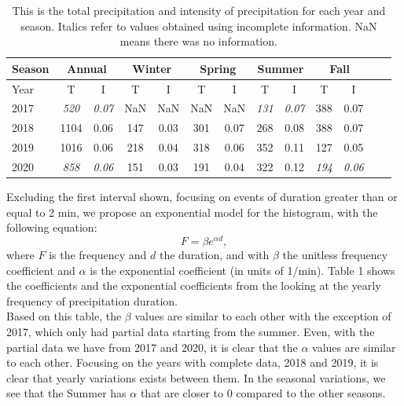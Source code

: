 \documentclass[11pt]{report}
\begin{document}
	
\begin{table}[t]
	\begin{center}
		\begin{tabular}{|l|*{11}{c|}r|}
			\hline
			Season    &       \multicolumn{2}{|c|}{Annual}          & \multicolumn{2}{|c|}{Winter}& \multicolumn{2}{|c|}{Spring}  & \multicolumn{2}{|c|}{Summer} &\multicolumn{2}{|c|}{Fall}  \\
			\hline
			Year      & T & I  & T & I  & T & I  & T & I  & T & I \\
			\hline
			2017      & \textit{520}  & \textit{0.07}  & NaN & NaN & NaN & NaN & \textit{131}  & \textit{0.07}  & 388  & 0.07  \\
			2018      & 1104           & 0.06  & 147 & 0.03 & 301 & 0.07 & 268  & 0.08  & 388 & 0.07  \\
			2019      & 1016           & 0.06  & 218  & 0.04 & 318 & 0.06 & 352 & 0.11  & 127 &  0.05 \\
			2020      & \textit{858}           & \textit{0.06}   & 151  & 0.03 & 191  & 0.04 & 322  & 0.12 & \textit{194} & \textit{0.06}\\
			\hline
		\end{tabular}
	\end{center}
	\caption[Summary of total precipitation and intensity]{This is the total precipitation and intensity of precipitation for each year and season. Italics refer to values obtained using incomplete information. NaN means there was no information. }
\end{table}
Excluding the first interval shown, focusing on events of duration
greater than or equal to 2 min, we propose an exponential model for
the histogram, with the following equation:
\begin{equation}
	F = \beta e^{\alpha d},
\end{equation}
where $F$ is the frequency and $d$ the duration, and with $\beta$ the
unitless frequency coefficient and $\alpha$ is the exponential
coefficient (in units of 1/min).
Table 1 shows
the coefficients and the exponential coefficients from the looking at
the yearly frequency of precipitation duration. 
\\ Based on this table, the $\beta$ values are similar to each other with
the exception of 2017, which only had partial data starting from the
summer. Even, with the partial data we have from 2017 and 2020, it is
clear that the $\alpha$ values are similar to each other. Focusing on
the years with complete data, 2018 and 2019, it is clear that yearly
variations exists between them. In the seasonal variations, we see that the Summer has $\alpha $ that are closer to 0 compared to the other seasons. 
\end{document}
